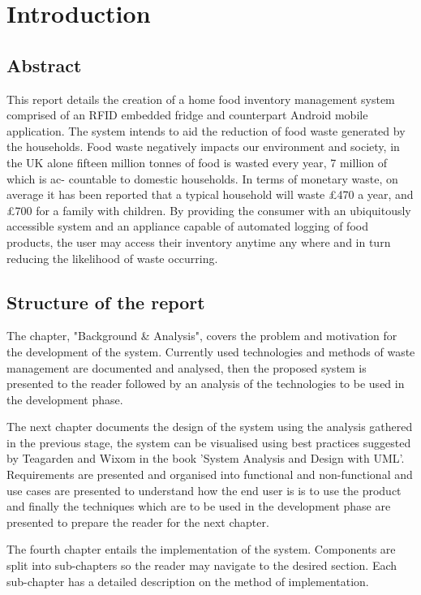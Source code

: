 \documentclass[a4paper, 11pt]{article}
\begin{document}
\setcounter{page}{1}
\section{Introduction}

\subsection{Abstract}
This report details the creation of a home food inventory management system comprised of an RFID embedded fridge and counterpart Android mobile application. The system intends to aid the reduction of food waste generated by the households. Food waste negatively impacts our environment and society, in the UK alone fifteen million tonnes of food is wasted every year, 7 million of which is ac- countable to domestic households.\cite{statistic} In terms of monetary waste, on average it has been reported that a typical household will waste \pounds{470} a year, and \pounds{700} for a family with children.\cite{WRAP} By providing the consumer with an ubiquitously accessible system and an appliance capable of automated logging of food products, the user may access their inventory anytime any where and in turn reducing the likelihood of waste occurring. 

\subsection{Structure of the report}
The chapter, "Background \& Analysis", covers the problem and motivation for the development of the system. Currently used technologies and methods of waste management are documented and analysed, then the proposed system is presented to the reader followed by an analysis of the technologies to be used in the development phase.

The next chapter documents the design of the system using the analysis gathered in the previous stage, the system can be visualised using best practices suggested by Teagarden and Wixom in the book 'System Analysis and Design with UML'. Requirements are presented and organised into functional and non-functional and use cases are presented to understand how the end user is is to use the product and finally the techniques which are to be used in the development phase are presented to prepare the reader for the next chapter. 

The fourth chapter entails the implementation of the system. Components are split into sub-chapters so the reader may navigate to the desired section. Each sub-chapter has a detailed description on the method of implementation.
\end{document}
